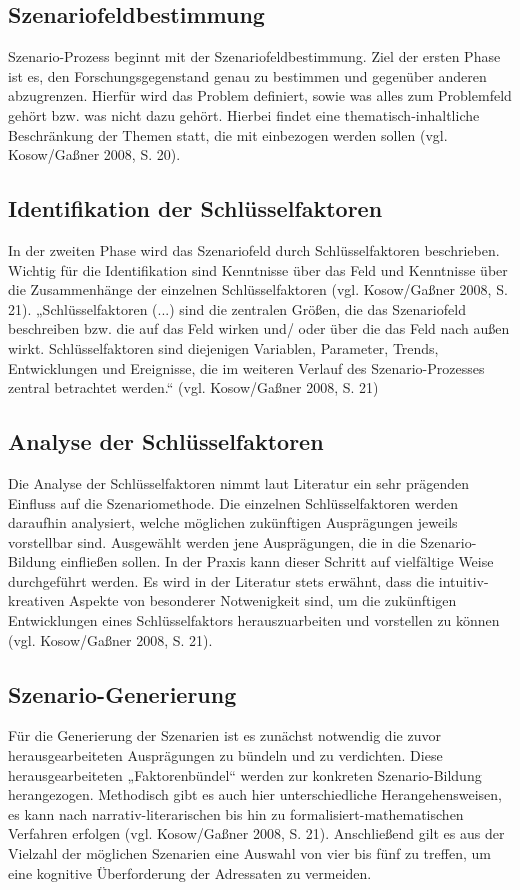 \documentclass[12pt,a4paper]{article}
\begin{document}
\subsection{Szenariofeldbestimmung }
Szenario-Prozess beginnt mit der Szenariofeldbestimmung. Ziel der ersten Phase ist es, den Forschungsgegenstand genau zu bestimmen und gegenüber anderen abzugrenzen. Hierfür wird das Problem definiert, sowie was alles zum Problemfeld gehört bzw. was nicht dazu gehört. Hierbei findet eine thematisch-inhaltliche Beschränkung der Themen statt, die mit einbezogen werden sollen (vgl. Kosow/Gaßner 2008, S. 20). 

\subsection{Identifikation der Schlüsselfaktoren} 
In der zweiten Phase wird das Szenariofeld durch Schlüsselfaktoren beschrieben. Wichtig für die Identifikation sind Kenntnisse über das Feld und Kenntnisse über die Zusammenhänge der einzelnen Schlüsselfaktoren (vgl. Kosow/Gaßner 2008, S. 21). „Schlüsselfaktoren (...) sind die zentralen Größen, die das Szenariofeld beschreiben bzw. die auf das Feld wirken und/ oder über die das Feld nach außen wirkt. Schlüsselfaktoren sind diejenigen Variablen, Parameter, Trends, Entwicklungen und Ereignisse, die im weiteren Verlauf des Szenario-Prozesses zentral betrachtet werden.“ (vgl. Kosow/Gaßner 2008, S. 21) 

\subsection{Analyse der Schlüsselfaktoren} 
Die Analyse der Schlüsselfaktoren nimmt laut Literatur ein sehr prägenden Einfluss auf die Szenariomethode. Die einzelnen Schlüsselfaktoren werden daraufhin analysiert, welche möglichen zukünftigen Ausprägungen jeweils vorstellbar sind. Ausgewählt werden jene Ausprägungen, die in die Szenario-Bildung einfließen sollen. In der Praxis kann dieser Schritt auf vielfältige Weise durchgeführt werden. Es wird in der Literatur stets erwähnt, dass die intuitiv-kreativen Aspekte von besonderer Notwenigkeit sind, um die zukünftigen Entwicklungen eines Schlüsselfaktors herauszuarbeiten und vorstellen zu können (vgl. Kosow/Gaßner 2008, S. 21). 

\subsection{Szenario-Generierung} 
Für die Generierung der Szenarien ist es zunächst notwendig die zuvor herausgearbeiteten Ausprägungen zu bündeln und zu verdichten. Diese herausgearbeiteten „Faktorenbündel“ werden zur konkreten Szenario-Bildung herangezogen. Methodisch gibt es auch hier unterschiedliche Herangehensweisen, es kann nach narrativ-literarischen bis hin zu formalisiert-mathematischen Verfahren erfolgen (vgl. Kosow/Gaßner 2008, S. 21). Anschließend gilt es aus der Vielzahl der möglichen Szenarien eine Auswahl von vier bis fünf zu treffen, um eine kognitive Überforderung der Adressaten zu vermeiden. 
\end{document}
